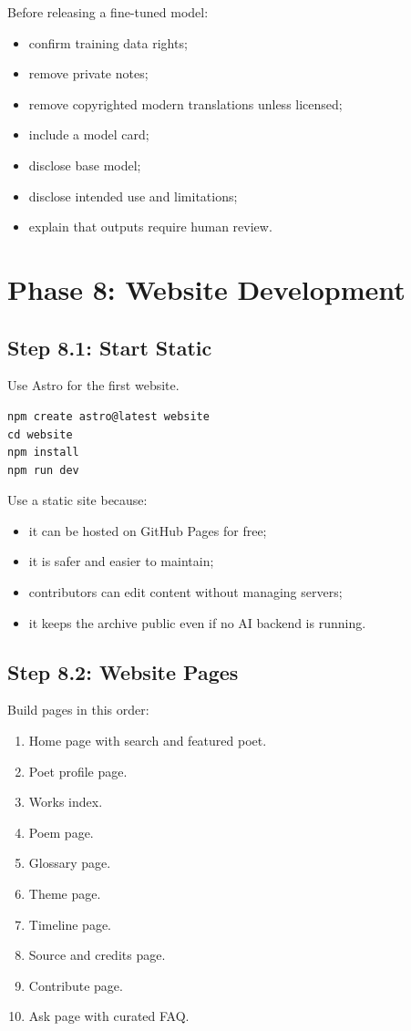 \documentclass[11pt]{article}
\begin{document}
Before releasing a fine-tuned model:

\begin{itemize}
  \item confirm training data rights;
  \item remove private notes;
  \item remove copyrighted modern translations unless licensed;
  \item include a model card;
  \item disclose base model;
  \item disclose intended use and limitations;
  \item explain that outputs require human review.
\end{itemize}

\section{Phase 8: Website Development}

\subsection{Step 8.1: Start Static}

Use Astro for the first website.

\begin{verbatim}
npm create astro@latest website
cd website
npm install
npm run dev
\end{verbatim}

Use a static site because:

\begin{itemize}
  \item it can be hosted on GitHub Pages for free;
  \item it is safer and easier to maintain;
  \item contributors can edit content without managing servers;
  \item it keeps the archive public even if no AI backend is running.
\end{itemize}

\subsection{Step 8.2: Website Pages}

Build pages in this order:

\begin{enumerate}
  \item Home page with search and featured poet.
  \item Poet profile page.
  \item Works index.
  \item Poem page.
  \item Glossary page.
  \item Theme page.
  \item Timeline page.
  \item Source and credits page.
  \item Contribute page.
  \item Ask page with curated FAQ.
\end{enumerate}
\end{document}

